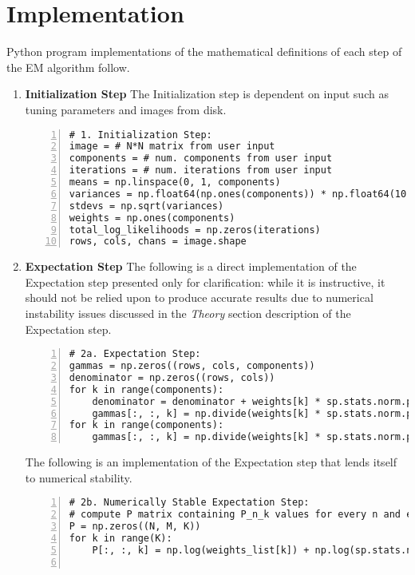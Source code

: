 \documentclass[conference]{IEEEtran}
\begin{document}
\section{Implementation}

Python program implementations of the mathematical definitions of each step of the EM algorithm follow.

\begin{enumerate}
    \item \textbf{Initialization Step} The Initialization step is dependent on input such as tuning parameters and images from disk.
\begin{lstlisting}[style=mypython, numbers=left, stepnumber=1, breakatwhitespace=true]
# 1. Initialization Step:
image = # N*N matrix from user input
components = # num. components from user input
iterations = # num. iterations from user input
means = np.linspace(0, 1, components) 
variances = np.float64(np.ones(components)) * np.float64(10 / 255)
stdevs = np.sqrt(variances)
weights = np.ones(components)
total_log_likelihoods = np.zeros(iterations)
rows, cols, chans = image.shape
\end{lstlisting}

    \item \textbf{Expectation Step} The following is a direct implementation of the Expectation step presented only for clarification: while it is instructive, it should not be relied upon to produce accurate results due to numerical instability issues discussed in the \emph{Theory} section description of the Expectation step.
\begin{lstlisting}[style=mypython, numbers=left, stepnumber=1, breakatwhitespace=true]
# 2a. Expectation Step:
gammas = np.zeros((rows, cols, components))
denominator = np.zeros((rows, cols)) 
for k in range(components):
    denominator = denominator + weights[k] * sp.stats.norm.pdf(image, means[k], stdevs[k])
    gammas[:, :, k] = np.divide(weights[k] * sp.stats.norm.pdf(image, means[k], stdevs[k]), denominator)
for k in range(components):
    gammas[:, :, k] = np.divide(weights[k] * sp.stats.norm.pdf(image, means[k], stdevs[k]), denominator) 
\end{lstlisting}

\quad The following is an implementation of the Expectation step that lends itself to numerical stability.

\begin{lstlisting}[style=mypython, numbers=left, stepnumber=1, breakatwhitespace=true]
# 2b. Numerically Stable Expectation Step:
# compute P matrix containing P_n_k values for every n and every k
P = np.zeros((N, M, K))
for k in range(K):
    P[:, :, k] = np.log(weights_list[k]) + np.log(sp.stats.norm.pdf(intensities, means_list[k], stdevs_list[k]))


\end{lstlisting}
\end{enumerate}
\end{document}
